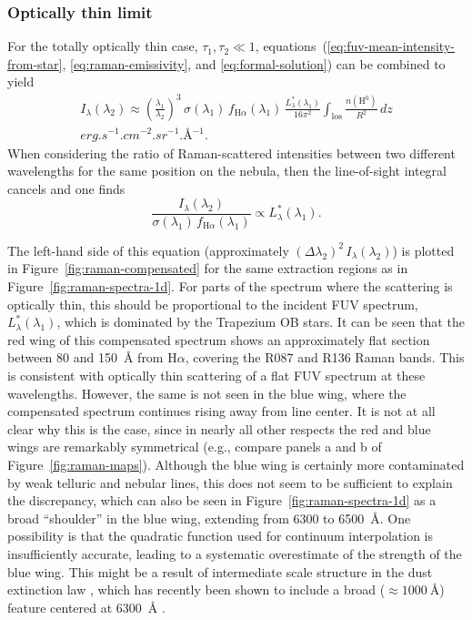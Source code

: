 \documentclass[useAMS, usenatbib, a4paper]{mnras}
\newcommand*\chem[1]{\ensuremath{\mathrm{#1}}}
\newcommand\ha{\ensuremath{\text{H}\alpha}}
\begin{document}
\subsubsection{Optically thin limit}
\label{sec:optically-thin-limit}

For the totally optically thin case, \(\tau_1, \tau_2 \ll 1\),
equations~(\ref{eq:fuv-mean-intensity-from-star},
\ref{eq:raman-emissivity},
and \ref{eq:formal-solution})
can be combined to yield
\begin{multline}
  \label{eq:optically-thin-intensity}
  I_\lambda (\lambda_2) \approx 
  \left(  \frac{\lambda_1}{\lambda_2}\right)^3 \, \sigma(\lambda_1) \, f_{\ha}(\lambda_1)
  \, \frac{L_\lambda^*(\lambda_1) } {16 \pi^2}
  \int_{\text{los}} \frac{n(\chem{H^0}) }{ R^2}  \, dz
  \\ \si{erg.s^{-1}.cm^{-2}.sr^{-1}.\angstrom^{-1}} .
\end{multline}
When considering the ratio of Raman-scattered intensities between two different wavelengths
for the same position on the nebula, then the line-of-sight integral cancels and one finds
\begin{equation}
  \label{eq:intensity-ratio-optically-thin}
  \frac{I_\lambda (\lambda_2)} {\sigma(\lambda_1) \, f_{\ha}(\lambda_1)} \propto L_\lambda^*(\lambda_1) .
\end{equation}

The left-hand side of this equation (approximately \((\Delta \lambda_2)^2\, I_\lambda (\lambda_2)\))
is plotted in Figure~\ref{fig:raman-compensated}
for the same extraction regions as in Figure~\ref{fig:raman-spectra-1d}. 
For parts of the spectrum where the scattering is optically thin,
this should be proportional to the incident FUV spectrum,
\(L_\lambda^*(\lambda_1)\),
which is dominated by the Trapezium OB stars. 
It can be seen that the red wing of this compensated spectrum
shows an approximately flat section
between \num{+80} and \SI{+150}{\angstrom} from \ha{},
covering the R087 and R136 Raman bands.
This is consistent with optically thin scattering of a flat FUV spectrum at these wavelengths.
However, the same is not seen in the blue wing,
where the compensated spectrum continues rising away from line center.
It is not at all clear why this is the case,
since in nearly all other respects the red and blue wings are remarkably symmetrical
(e.g., compare panels a and b of Figure~\ref{fig:raman-maps}).
Although the blue wing is certainly more contaminated
by weak telluric and nebular lines, this does not seem to be sufficient
to explain the discrepancy,
which can also be seen in Figure~\ref{fig:raman-spectra-1d} as a broad ``shoulder''
in the blue wing, extending from \num{6300} to \SI{6500}{\angstrom}.
One possibility is that the quadratic function used for continuum interpolation
is insufficiently accurate,
leading to a systematic overestimate of the strength of the blue wing.
This might be a result of intermediate scale structure
in the dust extinction law \citep{Whiteoak:1966a},
which has recently been shown to include a broad (\(\approx \SI{1000}{\angstrom}\))
feature centered at \SI{6300}{\angstrom} \citep{Massa:2020a}.
\end{document}
